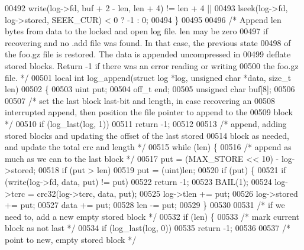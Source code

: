 \begin{DoxyCode}
00492            write(log->fd, buf + 2 - len, len + 4) != len + 4 ||
00493            lseek(log->fd, log->stored, SEEK\_CUR) < 0 ? -1 : 0;
00494 \}
00495 
00496 \textcolor{comment}{/* Append len bytes from data to the locked and open log file.  len may be zero}
00497 \textcolor{comment}{   if recovering and no .add file was found.  In that case, the previous state}
00498 \textcolor{comment}{   of the foo.gz file is restored.  The data is appended uncompressed in}
00499 \textcolor{comment}{   deflate stored blocks.  Return -1 if there was an error reading or writing}
00500 \textcolor{comment}{   the foo.gz file. */}
00501 local \textcolor{keywordtype}{int} log\_append(\textcolor{keyword}{struct} log *log, \textcolor{keywordtype}{unsigned} \textcolor{keywordtype}{char} *data, \textcolor{keywordtype}{size\_t} len)
00502 \{
00503     uint put;
00504     off\_t end;
00505     \textcolor{keywordtype}{unsigned} \textcolor{keywordtype}{char} buf[8];
00506 
00507     \textcolor{comment}{/* set the last block last-bit and length, in case recovering an}
00508 \textcolor{comment}{       interrupted append, then position the file pointer to append to the}
00509 \textcolor{comment}{       block */}
00510     \textcolor{keywordflow}{if} (log\_last(log, 1))
00511         \textcolor{keywordflow}{return} -1;
00512 
00513     \textcolor{comment}{/* append, adding stored blocks and updating the offset of the last stored}
00514 \textcolor{comment}{       block as needed, and update the total crc and length */}
00515     \textcolor{keywordflow}{while} (len) \{
00516         \textcolor{comment}{/* append as much as we can to the last block */}
00517         put = (MAX\_STORE << 10) - log->stored;
00518         if (put > len)
00519             put = (uint)len;
00520         \textcolor{keywordflow}{if} (put) \{
00521             \textcolor{keywordflow}{if} (write(log->fd, data, put) != put)
00522                 \textcolor{keywordflow}{return} -1;
00523             BAIL(1);
00524             log->tcrc = crc32(log->tcrc, data, put);
00525             log->tlen += put;
00526             log->stored += put;
00527             data += put;
00528             len -= put;
00529         \}
00530 
00531         \textcolor{comment}{/* if we need to, add a new empty stored block */}
00532         \textcolor{keywordflow}{if} (len) \{
00533             \textcolor{comment}{/* mark current block as not last */}
00534             \textcolor{keywordflow}{if} (log\_last(log, 0))
00535                 \textcolor{keywordflow}{return} -1;
00536 
00537             \textcolor{comment}{/* point to new, empty stored block */}

\end{DoxyCode}
